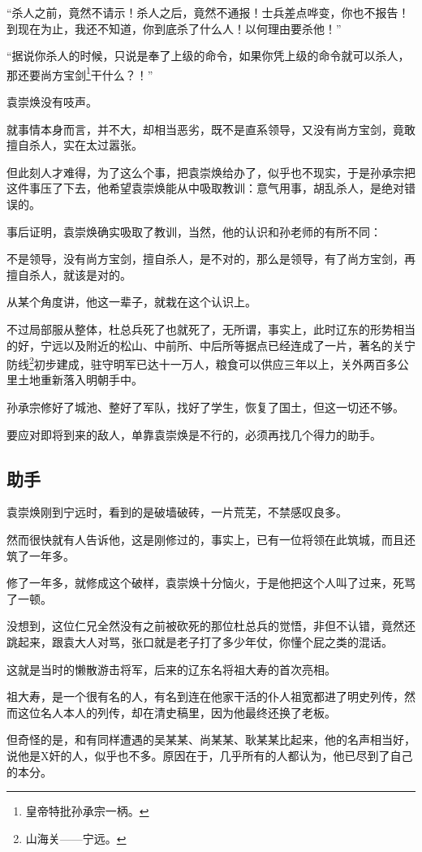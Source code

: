 \begin{multicols}{\theparacolNo}
“杀人之前，竟然不请示！杀人之后，竟然不通报！士兵差点哗变，你也不报告！到现在为止，我还不知道，你到底杀了什么人！以何理由要杀他！”

“据说你杀人的时候，只说是奉了上级的命令，如果你凭上级的命令就可以杀人，那还要尚方宝剑\footnote{皇帝特批孙承宗一柄。}干什么？！”

袁崇焕没有吱声。

就事情本身而言，并不大，却相当恶劣，既不是直系领导，又没有尚方宝剑，竟敢擅自杀人，实在太过嚣张。

但此刻人才难得，为了这么个事，把袁崇焕给办了，似乎也不现实，于是孙承宗把这件事压了下去，他希望袁崇焕能从中吸取教训：意气用事，胡乱杀人，是绝对错误的。

事后证明，袁崇焕确实吸取了教训，当然，他的认识和孙老师的有所不同：

不是领导，没有尚方宝剑，擅自杀人，是不对的，那么是领导，有了尚方宝剑，再擅自杀人，就该是对的。

从某个角度讲，他这一辈子，就栽在这个认识上。

不过局部服从整体，杜总兵死了也就死了，无所谓，事实上，此时辽东的形势相当的好，宁远以及附近的松山、中前所、中后所等据点已经连成了一片，著名的关宁防线\footnote{山海关——宁远。}初步建成，驻守明军已达十一万人，粮食可以供应三年以上，关外两百多公里土地重新落入明朝手中。

孙承宗修好了城池、整好了军队，找好了学生，恢复了国土，但这一切还不够。

要应对即将到来的敌人，单靠袁崇焕是不行的，必须再找几个得力的助手。

\subsection{助手}
袁崇焕刚到宁远时，看到的是破墙破砖，一片荒芜，不禁感叹良多。

然而很快就有人告诉他，这是刚修过的，事实上，已有一位将领在此筑城，而且还筑了一年多。

修了一年多，就修成这个破样，袁崇焕十分恼火，于是他把这个人叫了过来，死骂了一顿。

没想到，这位仁兄全然没有之前被砍死的那位杜总兵的觉悟，非但不认错，竟然还跳起来，跟袁大人对骂，张口就是老子打了多少年仗，你懂个屁之类的混话。

这就是当时的懒散游击将军，后来的辽东名将祖大寿的首次亮相。

祖大寿，是一个很有名的人，有名到连在他家干活的仆人祖宽都进了明史列传，然而这位名人本人的列传，却在清史稿里，因为他最终还换了老板。

但奇怪的是，和有同样遭遇的吴某某、尚某某、耿某某比起来，他的名声相当好，说他是X奸的人，似乎也不多。原因在于，几乎所有的人都认为，他已尽到了自己的本分。


\end{multicols}

